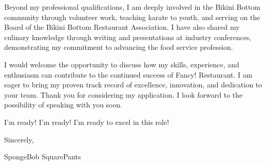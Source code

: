 {Beyond my professional qualifications, I am deeply involved in the Bikini Bottom community through volunteer work, teaching karate to youth, and serving on the Board of the Bikini Bottom Restaurant Association. I have also shared my culinary knowledge through writing and presentations at industry conferences, demonstrating my commitment to advancing the food service profession.

I would welcome the opportunity to discuss how my skills, experience, and enthusiasm can contribute to the continued success of Fancy! Restaurant. I am eager to bring my proven track record of excellence, innovation, and dedication to your team. Thank you for considering my application. I look forward to the possibility of speaking with you soon.

I'm ready! I'm ready! I'm ready to excel in this role!

Sincerely,

SpongeBob SquarePants
}
